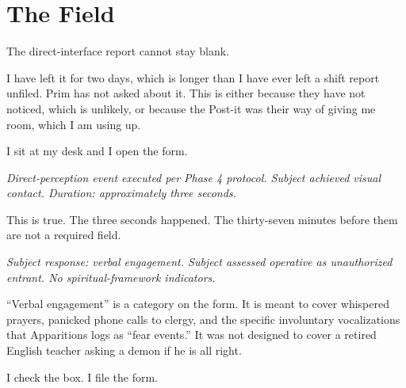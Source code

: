 
\chapter{The Field}

The direct-interface report cannot stay blank.

I have left it for two days, which is longer than I have ever left a shift report unfiled. Prim has not asked about it. This is either because they have not noticed, which is unlikely, or because the Post-it was their way of giving me room, which I am using up.

I sit at my desk and I open the form.

\emph{Direct-perception event executed per Phase 4 protocol. Subject achieved visual contact. Duration: approximately three seconds.}

This is true. The three seconds happened. The thirty-seven minutes before them are not a required field.

\emph{Subject response: verbal engagement. Subject assessed operative as unauthorized entrant. No spiritual-framework indicators.}

``Verbal engagement'' is a category on the form. It is meant to cover whispered prayers, panicked phone calls to clergy, and the specific involuntary vocalizations that Apparitions logs as ``fear events.'' It was not designed to cover a retired English teacher asking a demon if he is all right.

I check the box. I file the form.
